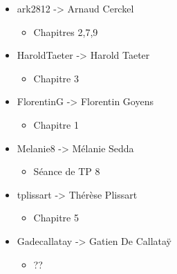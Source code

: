 \begin{itemize}
\begin{itemize}
    \end{itemize}
  \item ark2812 -> Arnaud Cerckel
    \begin{itemize}
      \item Chapitres 2,7,9
    \end{itemize}
  \item HaroldTaeter -> Harold Taeter
    \begin{itemize}
      \item Chapitre 3
    \end{itemize}
  \item FlorentinG -> Florentin Goyens
    \begin{itemize}
      \item Chapitre 1
    \end{itemize}
  \item Melanie8 -> Mélanie Sedda
    \begin{itemize}
      \item Séance de TP 8
    \end{itemize}
  \item tplissart -> Thérèse Plissart
    \begin{itemize}
      \item Chapitre 5
    \end{itemize}
  \item Gadecallatay -> Gatien De Callataÿ
    \begin{itemize}
      \item ??
    \end{itemize}
\end{itemize}

\clearpage
\printindex

